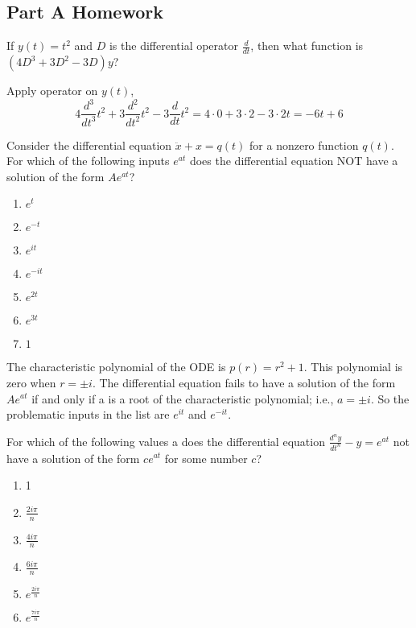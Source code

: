\subsection{Part A Homework}

\begin{homework}
  If $y(t)=t^2$ and $D$ is the differential operator $\frac{d}{dt}$, then what function is $(4D^3 +3D^2−3D)y$?
\end{homework}

Apply operator on $y(t)$,
\begin{equation*}
  4 \frac{d^3}{dt^3} t^2 + 3 \frac{d^2}{dt^2} t^2  - 3 \frac{d}{dt} t^2
  = 4 \cdot 0 + 3 \cdot 2 - 3\cdot 2t = -6t + 6 
\end{equation*}

\begin{homework}
  Consider the differential equation $\ddot x + x = q(t)$ for a nonzero function $q(t)$.
  For which of the following inputs $e^{at}$ does the differential equation NOT have a solution of the form $Ae^{at}$? 
\end{homework}

\begin{enumerate}
\item $e^t$
\item $e^{-t}$
\item $e^{it}$
\item $e^{-it}$
\item $e^{2t}$
\item $e^{3t}$
\item $1$
\end{enumerate}

The characteristic polynomial of the ODE is $p(r)=r^2+1$.
This polynomial is zero when $r= \pm i$.
The differential equation fails to have a solution of the form $Ae^{at}$ if and only if a is a root of the characteristic polynomial; i.e., $a=\pm i$. So the problematic inputs in the list are $e^{it}$ and $e^{−it}$.

\begin{homework}
  For which of the following values a does the differential equation $\frac{d^n y}{dt^n}−y = e^{at}$
  not have a solution of the form $ce^{at}$ for some number $c$?
\end{homework}

\begin{enumerate}
\item 1
\item $\frac{2i\pi }{n}$
\item $\frac{4i\pi }{n}$
\item $\frac{6i\pi }{n}$
\item $e^{\frac{2i\pi }{n}}$
\item $e^{\frac{7i\pi }{n}}$
\end{enumerate}


